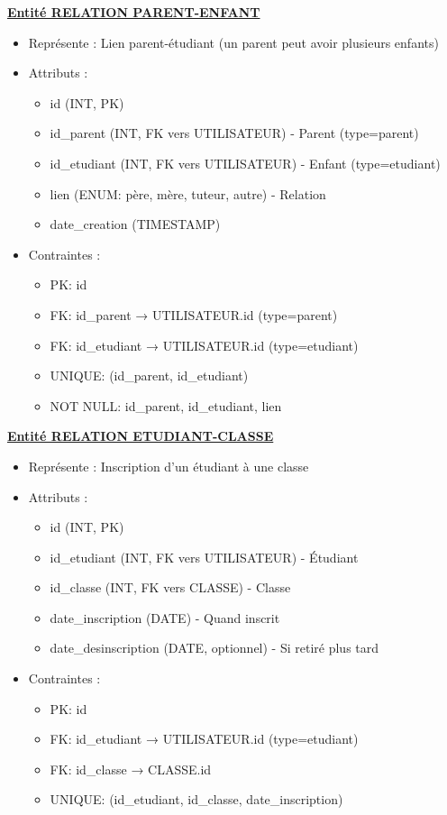\underline{\textbf{Entité RELATION PARENT-ENFANT}}
\begin{itemize}
  \item Représente : Lien parent-étudiant (un parent peut avoir plusieurs enfants)
  \item Attributs :
    \begin{itemize}
      \item id (INT, PK)
      \item id\_parent (INT, FK vers UTILISATEUR) - Parent (type=parent)
      \item id\_etudiant (INT, FK vers UTILISATEUR) - Enfant (type=etudiant)
      \item lien (ENUM: père, mère, tuteur, autre) - Relation
      \item date\_creation (TIMESTAMP)
    \end{itemize}
  \item Contraintes :
    \begin{itemize}
      \item PK: id
      \item FK: id\_parent → UTILISATEUR.id (type=parent)
      \item FK: id\_etudiant → UTILISATEUR.id (type=etudiant)
      \item UNIQUE: (id\_parent, id\_etudiant)
      \item NOT NULL: id\_parent, id\_etudiant, lien
    \end{itemize}
\end{itemize}

\underline{\textbf{Entité RELATION ETUDIANT-CLASSE}}
\begin{itemize}
  \item Représente : Inscription d'un étudiant à une classe
  \item Attributs :
    \begin{itemize}
      \item id (INT, PK)
      \item id\_etudiant (INT, FK vers UTILISATEUR) - Étudiant
      \item id\_classe (INT, FK vers CLASSE) - Classe
      \item date\_inscription (DATE) - Quand inscrit
      \item date\_desinscription (DATE, optionnel) - Si retiré plus tard
    \end{itemize}
  \item Contraintes :
    \begin{itemize}
      \item PK: id
      \item FK: id\_etudiant → UTILISATEUR.id (type=etudiant)
      \item FK: id\_classe → CLASSE.id
      \item UNIQUE: (id\_etudiant, id\_classe, date\_inscription)
    \end{itemize}
\end{itemize}

